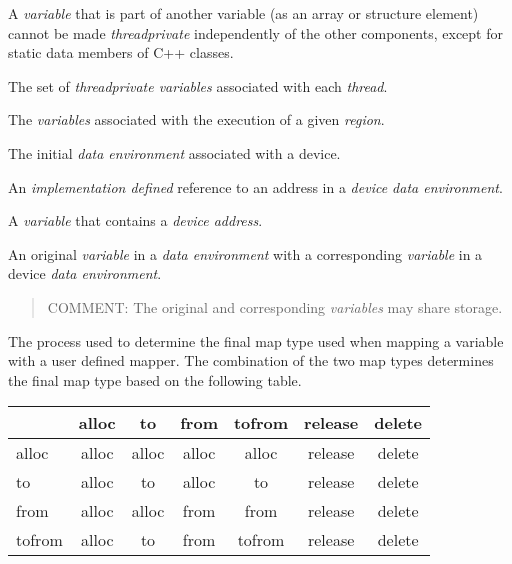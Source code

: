 A \emph{variable} that is part of another variable (as an array or structure element) cannot
be made \emph{threadprivate} independently of the other components, except for static
data members of C++ classes.
\glossarydefend

\glossarydefstart
The set of \emph{threadprivate variables} associated with each \emph{thread}.
\glossarydefend

\glossarydefstart
The \emph{variables} associated with the execution of a given \emph{region}.
\glossarydefend

\glossarydefstart
The initial \emph{data environment} associated with a device.
\glossarydefend
\bigskip

\glossarydefstart
An \emph{implementation defined} reference to an address in a \emph{device
  data environment}.
\glossarydefend

\glossarydefstart
A \emph{variable} that contains a \emph{device address}.
\glossarydefend


\glossarydefstart
An original \emph{variable} in a \emph{data environment} with a corresponding \emph{variable} in a
device \emph{data environment}.

\begin{quote}
COMMENT: The original and corresponding \emph{variables} may share storage.
\end{quote}
\glossarydefend

\glossarydefstart
The process used to determine the final map type used when mapping a variable
with a user defined mapper.  The combination of the two map types determines the
final map type based on the following table.

\begin{tabular}{l|c|c|c|c|c|c}
  & alloc & to    & from  & tofrom & release & delete \\
  \hline
alloc  & alloc & alloc & alloc & alloc  & release & delete \\
to     & alloc & to    & alloc & to     & release & delete \\
from   & alloc & alloc & from  & from   & release & delete \\
tofrom & alloc & to    & from  & tofrom & release & delete \\
\end{tabular}
\vspace{2ex} %
\glossarydefend

